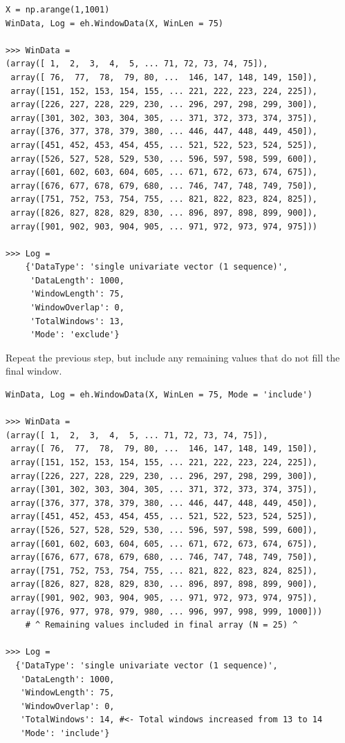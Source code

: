 \documentclass[12pt, a4paper, titlepage, openany]{book}
\begin{document}
\begin{verbatim}
X = np.arange(1,1001)
WinData, Log = eh.WindowData(X, WinLen = 75)

>>> WinData =
(array([ 1,  2,  3,  4,  5, ... 71, 72, 73, 74, 75]),
 array([ 76,  77,  78,  79, 80, ...  146, 147, 148, 149, 150]),
 array([151, 152, 153, 154, 155, ... 221, 222, 223, 224, 225]),
 array([226, 227, 228, 229, 230, ... 296, 297, 298, 299, 300]),
 array([301, 302, 303, 304, 305, ... 371, 372, 373, 374, 375]),
 array([376, 377, 378, 379, 380, ... 446, 447, 448, 449, 450]),
 array([451, 452, 453, 454, 455, ... 521, 522, 523, 524, 525]),
 array([526, 527, 528, 529, 530, ... 596, 597, 598, 599, 600]),
 array([601, 602, 603, 604, 605, ... 671, 672, 673, 674, 675]),
 array([676, 677, 678, 679, 680, ... 746, 747, 748, 749, 750]),
 array([751, 752, 753, 754, 755, ... 821, 822, 823, 824, 825]),
 array([826, 827, 828, 829, 830, ... 896, 897, 898, 899, 900]),
 array([901, 902, 903, 904, 905, ... 971, 972, 973, 974, 975]))

>>> Log =
    {'DataType': 'single univariate vector (1 sequence)',
     'DataLength': 1000,
     'WindowLength': 75,
     'WindowOverlap': 0,
     'TotalWindows': 13,
     'Mode': 'exclude'}
\end{verbatim}

\newpage
Repeat the previous step, but include any remaining values that do not fill the final window.
\begin{verbatim}
WinData, Log = eh.WindowData(X, WinLen = 75, Mode = 'include')

>>> WinData =
(array([ 1,  2,  3,  4,  5, ... 71, 72, 73, 74, 75]),
 array([ 76,  77,  78,  79, 80, ...  146, 147, 148, 149, 150]),
 array([151, 152, 153, 154, 155, ... 221, 222, 223, 224, 225]),
 array([226, 227, 228, 229, 230, ... 296, 297, 298, 299, 300]),
 array([301, 302, 303, 304, 305, ... 371, 372, 373, 374, 375]),
 array([376, 377, 378, 379, 380, ... 446, 447, 448, 449, 450]),
 array([451, 452, 453, 454, 455, ... 521, 522, 523, 524, 525]),
 array([526, 527, 528, 529, 530, ... 596, 597, 598, 599, 600]),
 array([601, 602, 603, 604, 605, ... 671, 672, 673, 674, 675]),
 array([676, 677, 678, 679, 680, ... 746, 747, 748, 749, 750]),
 array([751, 752, 753, 754, 755, ... 821, 822, 823, 824, 825]),
 array([826, 827, 828, 829, 830, ... 896, 897, 898, 899, 900]),
 array([901, 902, 903, 904, 905, ... 971, 972, 973, 974, 975]),
 array([976, 977, 978, 979, 980, ... 996, 997, 998, 999, 1000]))  
    # ^ Remaining values included in final array (N = 25) ^ 

>>> Log =
  {'DataType': 'single univariate vector (1 sequence)',
   'DataLength': 1000,
   'WindowLength': 75,
   'WindowOverlap': 0,
   'TotalWindows': 14, #<- Total windows increased from 13 to 14
   'Mode': 'include'}
\end{verbatim}
\end{document}
